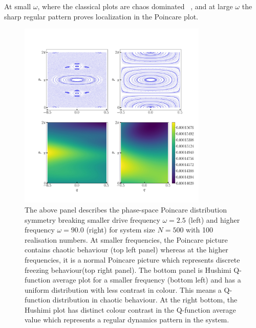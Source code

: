 \documentclass[%
 reprint,
superscriptaddress,
 amsmath,amssymb,
 aps,
prb,
]{revtex4-2}
\begin{document}
At small $\omega$, where the classical plots are chaos dominated ~\cite{reichl_transition_2021}, and at large $\omega$ the sharp regular pattern proves localization in the Poincare plot. 
\begin{figure}[ht!]
	\centering
	\includegraphics[height = 9.0cm, width = 9.0 cm]{lmg_poincare.jpeg}
	\caption{The above panel describes the phase-space Poincare distribution symmetry breaking smaller drive frequency $\omega = 2.5$ (left) and higher frequency $\omega = 90.0$ (right) for system size $N=500$ with 100 realisation numbers. At smaller frequencies, the Poincare picture contains chaotic behaviour (top left panel) whereas at the higher frequencies, it is a normal Poincare picture which represents discrete freezing behaviour(top right panel). The bottom panel is Hushimi Q-function average plot for  a smaller frequency (bottom left) and has a uniform distribution with less contrast in colour. This means a Q-function distribution in chaotic behaviour. At the right bottom, the Hushimi plot has distinct colour contrast in the Q-function average value which represents a regular dynamics pattern in the system.}
	\label{fig:classical_lipkin}
\end{figure}
\end{document}

